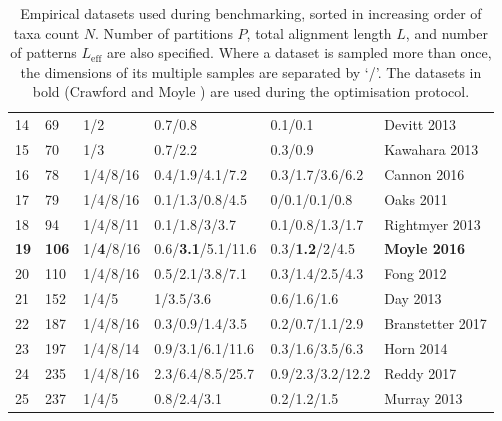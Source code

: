 \documentclass[10pt,letterpaper]{article}
\begin{document}
\begin{table}[h!]
\begin{tabular}{|l| l l l l l|}
14  &  69  &  1/2  &  0.7/0.8  &  0.1/0.1  &  Devitt 2013 \cite{Devitt_2013} \\ 

15  &  70  &  1/3  &  0.7/2.2  &  0.3/0.9  &  Kawahara 2013 \cite{Kawahara_2013} \\ 

16  &  78  &  1/4/8/16  &  0.4/1.9/4.1/7.2  &  0.3/1.7/3.6/6.2  &  Cannon 2016 \cite{Cannon_2016} \\ 

17  &  79  &  1/4/8/16  &  0.1/1.3/0.8/4.5  &  0/0.1/0.1/0.8  &  Oaks 2011 \cite{Oaks_2011} \\ 

18  &  94  &  1/4/8/11  &  0.1/1.8/3/3.7  &  0.1/0.8/1.3/1.7  &  Rightmyer 2013 \cite{Rightmyer_2013} \\ 

\textbf{19}  &  \textbf{106}  &  1/\textbf{4}/8/16  &  0.6/\textbf{3.1}/5.1/11.6  &  0.3/\textbf{1.2}/2/4.5  &  \textbf{Moyle 2016} \cite{Moyle_2016} \\ 

20  &  110  &  1/4/8/16  &  0.5/2.1/3.8/7.1  &  0.3/1.4/2.5/4.3  &  Fong 2012 \cite{Fong_2012} \\ 

21  &  152  &  1/4/5  &  1/3.5/3.6  &  0.6/1.6/1.6  &  Day 2013 \cite{Day_2013} \\ 

22  &  187  &  1/4/8/16  &  0.3/0.9/1.4/3.5  &  0.2/0.7/1.1/2.9  &  Branstetter 2017 \cite{Branstetter_2017} \\ 

23  &  197  &  1/4/8/14  &  0.9/3.1/6.1/11.6  &  0.3/1.6/3.5/6.3  &  Horn 2014 \cite{Horn_2014} \\ 

24  &  235  &  1/4/8/16  &  2.3/6.4/8.5/25.7  &  0.9/2.3/3.2/12.2  &  Reddy 2017 \cite{Reddy_2017} \\ 

25  &  237  &  1/4/5  &  0.8/2.4/3.1  &  0.2/1.2/1.5  &  Murray 2013 \cite{Murray_2013} \\ 


 \hline
\end{tabular}
\caption{Empirical datasets used during benchmarking, sorted in increasing order of taxa count $N$. Number of partitions $P$, total alignment length $L$, and number of patterns $L_\text{eff}$ are also specified. Where a dataset is sampled more than once, the dimensions of its multiple samples are separated by `/'. The datasets in bold (Crawford \cite{Crawford_2012} and Moyle \cite{Moyle_2016}) are used during the optimisation protocol. }
\label{table:datasets}
\end{table}
\end{document}
